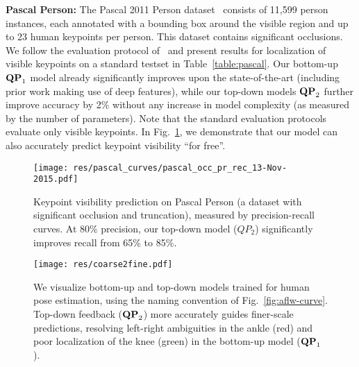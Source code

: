 \documentclass[10pt,twocolumn,letterpaper]{article}
\newcommand{\QP}[1]{{${\bf QP}_{#1}$}}
\begin{document}
{\bf Pascal Person:} The Pascal 2011 Person
dataset~\cite{hariharan2011semantic} consists of 11,599 person
instances, each annotated with a bounding box around the visible
region and up to 23 human keypoints per person. This dataset contains
significant occlusions. We follow the evaluation protocol of~\cite{long2014convnets} and
present results for localization of visible keypoints on a standard
testset in Table~\ref{table:pascal}. Our bottom-up \QP{1} model
already significantly improves upon the state-of-the-art (including
prior work making use of deep features), while our top-down models
\QP{2} further improve accuracy by 2\% without any increase in model
complexity (as measured by the number of parameters). Note that the
standard evaluation protocols evaluate only visible keypoints. In
Fig.~\ref{fig:pascal-occ}, we demonstrate that our model can also
accurately predict keypoint visibility ``for free''.

\begin{figure}[t!]
  \centering
  \texttt{[image: res/pascal\_curves/pascal\_occ\_pr\_rec\_13-Nov-2015.pdf]}
  \caption{Keypoint visibility prediction on Pascal Person (a dataset with significant occlusion and truncation), measured by
    precision-recall curves. At 80\% precision, our top-down model ($QP_2$) significantly improves recall from 65\% to 85\%.}
  \label{fig:pascal-occ}
\end{figure}



\begin{figure*}[t!]
  \centering
  \texttt{[image: res/coarse2fine.pdf]}
\caption{We visualize bottom-up and top-down models trained for human pose estimation, using the naming convention of Fig.~\ref{fig:aflw-curve}. Top-down feedback (\QP{2}) more accurately guides finer-scale predictions, resolving left-right ambiguities in the ankle (red) and poor localization of the knee (green) in the bottom-up model (\QP{1}).}
  \label{fig:coarse2fine}
\end{figure*}
\end{document}
